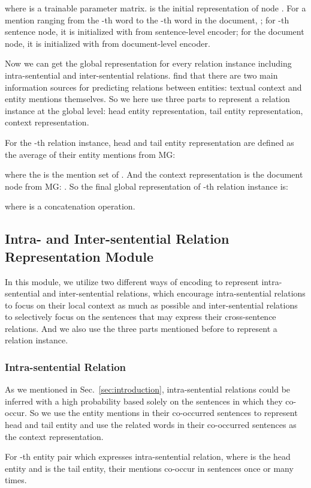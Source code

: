 \documentclass[11pt,a4paper]{article}
\begin{document}
where  is a trainable parameter matrix.  is the initial representation of node . For a mention ranging from the -th word to the -th word in the document, ; for -th sentence node, it is initialized with  from sentence-level encoder; for the document node, it is initialized with  from document-level encoder.

Now we can get the global representation for every relation instance including intra-sentential and inter-sentential relations. \citet{THU_RE} find that there are two main information sources for predicting relations between entities: textual context and entity mentions themselves. So we here use three parts to represent a relation instance at the global level: head entity representation, tail entity representation, context representation.

For the -th relation instance, head and tail entity representation are defined as the average of their entity mentions from MG:

where the  is the mention set of . And the context representation is the document node from MG: . So the final global representation of -th relation instance is:

where  is a concatenation operation.

\subsection{Intra- and Inter-sentential Relation Representation Module\label{ssec:intra-inter}}
In this module, we utilize two different ways of encoding to represent intra-sentential and inter-sentential relations, which encourage intra-sentential relations to focus on their local context as much as possible and inter-sentential relations to selectively focus on the sentences that may express their cross-sentence relations. And we also use the three parts mentioned before to represent a relation instance.

\subsubsection{Intra-sentential Relation}
As we mentioned in Sec.~\ref{sec:introduction}, intra-sentential relations could be inferred with a high probability based solely on the sentences in which they co-occur. So we use the entity mentions in their co-occurred sentences to represent head and tail entity and use the related words in their co-occurred sentences as the context representation.

For -th entity pair  which expresses intra-sentential relation, where  is the head entity and  is the tail entity, their mentions co-occur in  sentences  once or many times.
\end{document}
